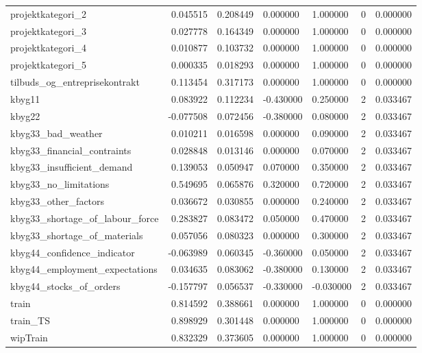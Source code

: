 \begin{landscape}
\begin{longtable}[h!]{lrrllrr}
projektkategori_2 & 0.045515 & 0.208449 & 0.000000 & 1.000000 & 0 & 0.000000 \\
projektkategori_3 & 0.027778 & 0.164349 & 0.000000 & 1.000000 & 0 & 0.000000 \\
projektkategori_4 & 0.010877 & 0.103732 & 0.000000 & 1.000000 & 0 & 0.000000 \\
projektkategori_5 & 0.000335 & 0.018293 & 0.000000 & 1.000000 & 0 & 0.000000 \\
tilbuds_og_entreprisekontrakt & 0.113454 & 0.317173 & 0.000000 & 1.000000 & 0 & 0.000000 \\
kbyg11 & 0.083922 & 0.112234 & -0.430000 & 0.250000 & 2 & 0.033467 \\
kbyg22 & -0.077508 & 0.072456 & -0.380000 & 0.080000 & 2 & 0.033467 \\
kbyg33_bad_weather & 0.010211 & 0.016598 & 0.000000 & 0.090000 & 2 & 0.033467 \\
kbyg33_financial_contraints & 0.028848 & 0.013146 & 0.000000 & 0.070000 & 2 & 0.033467 \\
kbyg33_insufficient_demand & 0.139053 & 0.050947 & 0.070000 & 0.350000 & 2 & 0.033467 \\
kbyg33_no_limitations & 0.549695 & 0.065876 & 0.320000 & 0.720000 & 2 & 0.033467 \\
kbyg33_other_factors & 0.036672 & 0.030855 & 0.000000 & 0.240000 & 2 & 0.033467 \\
kbyg33_shortage_of_labour_force & 0.283827 & 0.083472 & 0.050000 & 0.470000 & 2 & 0.033467 \\
kbyg33_shortage_of_materials & 0.057056 & 0.080323 & 0.000000 & 0.300000 & 2 & 0.033467 \\
kbyg44_confidence_indicator & -0.063989 & 0.060345 & -0.360000 & 0.050000 & 2 & 0.033467 \\
kbyg44_employment_expectations & 0.034635 & 0.083062 & -0.380000 & 0.130000 & 2 & 0.033467 \\
kbyg44_stocks_of_orders & -0.157797 & 0.056537 & -0.330000 & -0.030000 & 2 & 0.033467 \\
train & 0.814592 & 0.388661 & 0.000000 & 1.000000 & 0 & 0.000000 \\
train_TS & 0.898929 & 0.301448 & 0.000000 & 1.000000 & 0 & 0.000000 \\
wipTrain & 0.832329 & 0.373605 & 0.000000 & 1.000000 & 0 & 0.000000 \\
\end{longtable}\end{landscape}
